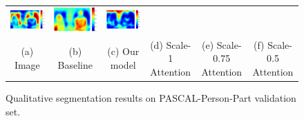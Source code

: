 \documentclass[10pt,twocolumn,letterpaper]{article}
\begin{document}
\begin{figure}
\begin{tabular}{c c c c c c}
   \includegraphics[height=0.087\linewidth]{fig/voc10_part/att1/2010_004952.pdf} &
   \includegraphics[height=0.087\linewidth]{fig/voc10_part/att2/2010_004952.pdf} &
   \includegraphics[height=0.087\linewidth]{fig/voc10_part/att3/2010_004952.pdf} \\
   {\scriptsize (a) Image} & 
   {\scriptsize (b) Baseline} & 
   {\scriptsize (c) Our model} & 
   {\scriptsize (d) Scale-1 Attention} & 
   {\scriptsize (e) Scale-0.75 Attention} &
   {\scriptsize (f) Scale-0.5 Attention} \\
  \end{tabular}
  \caption{Qualitative segmentation results on PASCAL-Person-Part validation set.}
  \label{fig:pascal_part_results}  
\end{figure}
\end{document}
